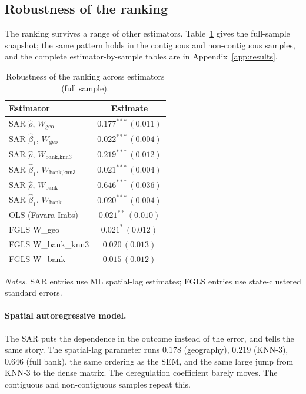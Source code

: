 \subsection{Robustness of the ranking}
\label{sec:robust-results}

The ranking survives a range of other estimators. Table~\ref{tab:robust-snap} gives
the full-sample snapshot; the same pattern holds in the contiguous and
non-contiguous samples, and the complete estimator-by-sample tables are in Appendix~\ref{app:results}.

\begin{table}[htbp]
  \centering
  \caption{Robustness of the ranking across estimators (full sample).}
  \label{tab:robust-snap}
  \small
  \begin{tabular}{lc}
    \toprule
    Estimator & Estimate \\
    \midrule
    SAR $\hat\rho$, $W_{\text{geo}}$ & $0.177^{***}\,(0.011)$ \\
    SAR $\hat\beta_1$, $W_{\text{geo}}$ & $0.022^{***}\,(0.004)$ \\
    SAR $\hat\rho$, $W_{\text{bank,knn3}}$ & $0.219^{***}\,(0.012)$ \\
    SAR $\hat\beta_1$, $W_{\text{bank,knn3}}$ & $0.021^{***}\,(0.004)$ \\
    SAR $\hat\rho$, $W_{\text{bank}}$ & $0.646^{***}\,(0.036)$ \\
    SAR $\hat\beta_1$, $W_{\text{bank}}$ & $0.020^{***}\,(0.004)$ \\
    \addlinespace
    OLS (Favara-Imbs) & $0.021^{**}\,(0.010)$ \\
    FGLS W\_geo & $0.021^{*}\,(0.012)$ \\
    FGLS W\_bank\_knn3 & $0.020\,(0.013)$ \\
    FGLS W\_bank & $0.015\,(0.012)$ \\
    \bottomrule
  \end{tabular}
  \begin{tablenotes}\footnotesize
  \item \emph{Notes.} SAR entries use ML spatial-lag estimates; FGLS entries use state-clustered standard errors.
  \end{tablenotes}
\end{table}

\paragraph{Spatial autoregressive model.} The SAR puts the dependence in the
outcome instead of the error, and tells the same story. The spatial-lag parameter
runs $0.178$ (geography), $0.219$ (KNN-3), $0.646$ (full bank), the same
ordering as the SEM, and the same large jump from KNN-3 to the dense matrix. The
deregulation coefficient barely moves. The
contiguous and non-contiguous samples repeat this.

